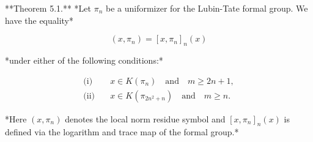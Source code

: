 **Theorem 5.1.** *Let $\pi_n$ be a uniformizer for the Lubin-Tate formal group. We have the equality*

$$(x, \pi_n) = [x, \pi_n]_n(x)$$

*under either of the following conditions:*

$$
\begin{aligned}
\text{(i)}&\quad x \in K(\pi_n) \quad\text{and}\quad m \ge 2n + 1,\\[4pt]
\text{(ii)}&\quad x \in K(\pi_{2n^2 + n}) \quad\text{and}\quad m \ge n.
\end{aligned}
$$

*Here $(x, \pi_n)$ denotes the local norm residue symbol and $[x, \pi_n]_n(x)$ is defined via the logarithm and trace map of the formal group.*
